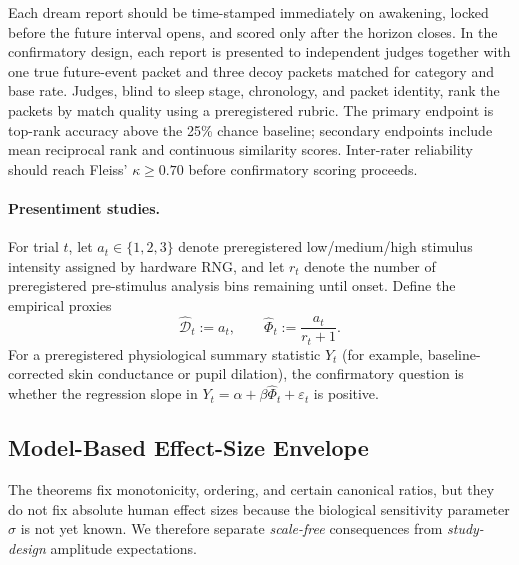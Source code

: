 \documentclass[11pt, a4paper]{article}
\theoremstyle{definition}
\theoremstyle{remark}
\begin{document}
Each dream report should be time-stamped immediately on awakening,
locked before the future interval opens, and scored only after the
horizon closes. In the confirmatory design, each report is presented
to independent judges together with one true future-event packet and
three decoy packets matched for category and base rate. Judges, blind
to sleep stage, chronology, and packet identity, rank the packets by
match quality using a preregistered rubric. The primary endpoint is
top-rank accuracy above the 25\% chance baseline; secondary endpoints
include mean reciprocal rank and continuous similarity scores.
Inter-rater reliability should reach Fleiss' $\kappa \geq 0.70$
before confirmatory scoring proceeds.

\paragraph{Presentiment studies.}
For trial $t$, let $a_t \in \{1,2,3\}$ denote preregistered
low/medium/high stimulus intensity assigned by hardware RNG, and let
$r_t$ denote the number of preregistered pre-stimulus analysis bins
remaining until onset. Define the empirical proxies
\begin{equation}\label{eq:debt-proxy-presentiment}
    \widehat{\mathcal{D}}_t := a_t,
    \qquad
    \widehat{\Phi}_t := \frac{a_t}{r_t + 1}.
\end{equation}
For a preregistered physiological summary statistic $Y_t$ (for
example, baseline-corrected skin conductance or pupil dilation), the
confirmatory question is whether the regression slope in
$Y_t = \alpha + \beta \widehat{\Phi}_t + \varepsilon_t$ is positive.

\subsection{Model-Based Effect-Size Envelope}\label{sec:effects}

The theorems fix monotonicity, ordering, and certain canonical ratios,
but they do not fix absolute human effect sizes because the biological
sensitivity parameter $\sigma$ is not yet known. We therefore
separate \emph{scale-free} consequences from \emph{study-design}
amplitude expectations.
\end{document}
